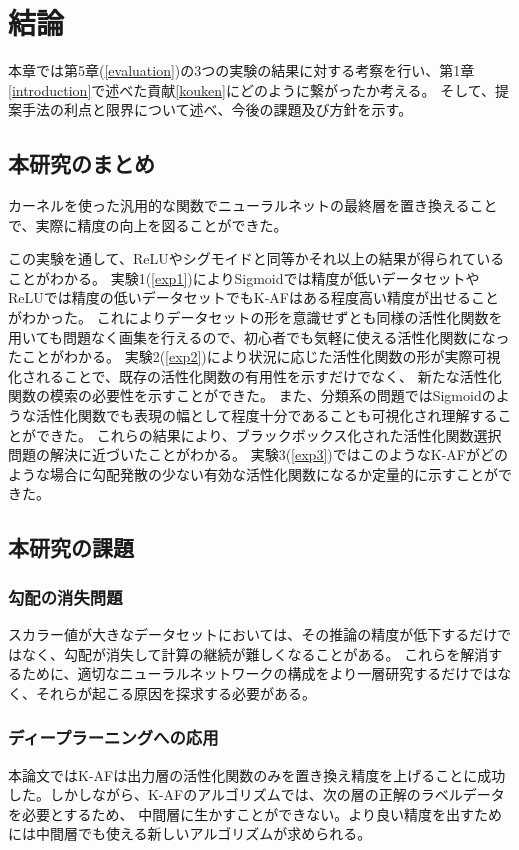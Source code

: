 \chapter{結論}
\label{conclusion}

本章では第5章(\ref{evaluation})の3つの実験の結果に対する考察を行い、第1章\ref{introduction}で述べた貢献\ref{kouken}にどのように繋がったか考える。
そして、提案手法の利点と限界について述べ、今後の課題及び方針を示す。


\section{本研究のまとめ}

カーネルを使った汎用的な関数でニューラルネットの最終層を置き換えることで、実際に精度の向上を図ることができた。

この実験を通して、ReLUやシグモイドと同等かそれ以上の結果が得られていることがわかる。
 実験1(\ref{exp1})によりSigmoidでは精度が低いデータセットやReLUでは精度の低いデータセットでもK-AFはある程度高い精度が出せることがわかった。
これによりデータセットの形を意識せずとも同様の活性化関数を用いても問題なく画集を行えるので、初心者でも気軽に使える活性化関数になったことがわかる。
 実験2(\ref{exp2})により状況に応じた活性化関数の形が実際可視化されることで、既存の活性化関数の有用性を示すだけでなく、
 新たな活性化関数の模索の必要性を示すことができた。
 また、分類系の問題ではSigmoidのような活性化関数でも表現の幅として程度十分であることも可視化され理解することができた。
これらの結果により、ブラックボックス化された活性化関数選択問題の解決に近づいたことがわかる。
 実験3(\ref{exp3})ではこのようなK-AFがどのような場合に勾配発散の少ない有効な活性化関数になるか定量的に示すことができた。



\section{本研究の課題}

\subsection{勾配の消失問題}
スカラー値が大きなデータセットにおいては、その推論の精度が低下するだけではなく、勾配が消失して計算の継続が難しくなることがある。
これらを解消するために、適切なニューラルネットワークの構成をより一層研究するだけではなく、それらが起こる原因を探求する必要がある。



\subsection{ディープラーニングへの応用}
本論文ではK-AFは出力層の活性化関数のみを置き換え精度を上げることに成功した。しかしながら、K-AFのアルゴリズムでは、次の層の正解のラベルデータを必要とするため、
中間層に生かすことができない。より良い精度を出すためには中間層でも使える新しいアルゴリズムが求められる。



